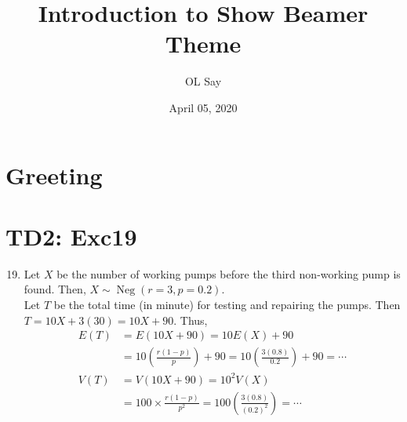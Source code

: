 \documentclass[serif,t]{beamer}
\title[Show Theme]{Introduction to Show Beamer Theme}
\author[Say]{OL Say}
\date[04/05/20]{April 05, 2020}
\institute[KhTUG]{Khmer TeX Users Group}
\begin{document}
    \section{Greeting}
    \begin{frame}
        \titlepage
    \end{frame}
    \section{TD2: Exc19}
    \begin{frame}[allowframebreaks]
        \begin{enumerate}
            \setcounter{enumi}{18}
            \item Let $ X $ be the number of working pumps before the third non-working pump is found. Then, $ X\sim\operatorname{Neg}(r=3,p=0.2). $\\
            Let $ T $ be the total time (in minute) for testing and repairing the pumps. Then $ T=10X+3(30)=10X+90. $ Thus,
            \begin{align*}
            E(T) &=E(10X+90)=10E(X)+90\\
            &=10\left( \frac{r(1-p)}{p} \right)+90
            =10\left( \frac{3(0.8)}{0.2} \right)+90
            =\cdots\\
            V(T) &=V(10X+90)=10^{2}V(X)\\
            &=100\times \frac{r(1-p)}{p^{2}}
            =100\left( \frac{3(0.8)}{(0.2)^{2}} \right)=\cdots
            \end{align*}
        \end{enumerate}
    \end{frame}
\end{document}
